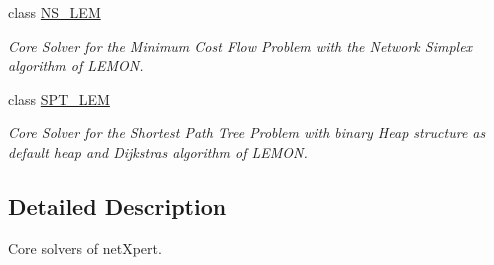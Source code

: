 \begin{DoxyCompactItemize}
class \hyperlink{classnetxpert_1_1core_1_1NS__LEM}{N\+S\+\_\+\+L\+EM}
\begin{DoxyCompactList}\small\item\em Core Solver for the Minimum Cost Flow Problem with the Network Simplex algorithm of L\+E\+M\+ON. \end{DoxyCompactList}\item 
class \hyperlink{classnetxpert_1_1core_1_1SPT__LEM}{S\+P\+T\+\_\+\+L\+EM}
\begin{DoxyCompactList}\small\item\em Core Solver for the Shortest Path Tree Problem with binary Heap structure as default heap and Dijkstra\textquotesingle{}s algorithm of L\+E\+M\+ON. \end{DoxyCompactList}\end{DoxyCompactItemize}


\subsection{Detailed Description}
Core solvers of net\+Xpert. 